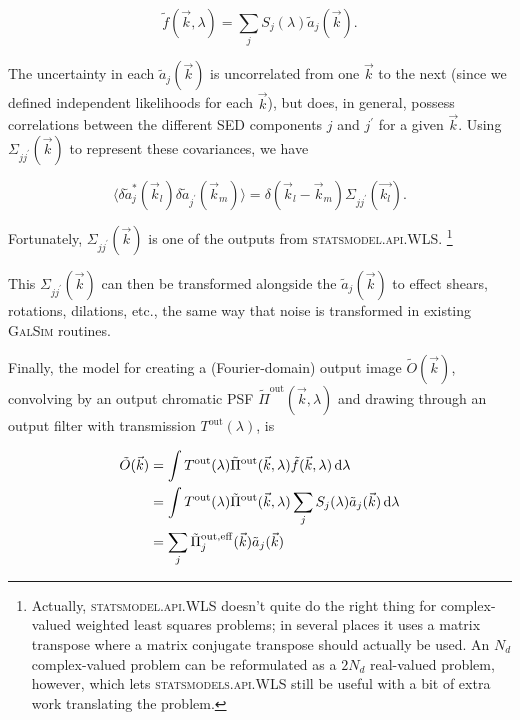 \documentclass{article}
\begin{document}
\begin{equation}
  \tilde{f}(\vec{k}, \lambda) = \sum_j S_j(\lambda) \tilde{a}_j(\vec{k}).
\end{equation}

The uncertainty in each $\tilde{a}_j(\vec{k})$ is uncorrelated from one $\vec{k}$ to the next (since
we defined independent likelihoods for each $\vec{k}$), but does, in general, possess correlations
between the different SED components $j$ and $j^\prime$ for a given $\vec{k}$.  Using
$\Sigma_{jj^\prime}(\vec{k})$ to represent these covariances, we have

\begin{equation}
    \langle\delta\tilde{a}^*_j(\vec{k}_l)\delta\tilde{a}_{j^\prime}(\vec{k}_m)\rangle = \delta(\vec{k}_l - \vec{k}_m)\Sigma_{jj^\prime}(\vec{k_l}).
\end{equation}

Fortunately, $\Sigma_{jj^\prime}(\vec{k})$ is one of the outputs from \textsc{statsmodel.api.WLS}.
\footnote{Actually, \textsc{statsmodel.api.WLS} doesn't quite do the right thing for complex-valued
weighted least squares problems; in several places it uses a matrix transpose where a matrix
conjugate transpose should actually be used.  An $N_d$ complex-valued problem can be reformulated as
a $2 N_d$ real-valued problem, however, which lets \textsc{statsmodels.api.WLS} still be useful with
a bit of extra work translating the problem.}

This $\Sigma_{jj^\prime}(\vec{k})$ can then be transformed alongside the $\tilde{a}_j(\vec{k})$ to
effect shears, rotations, dilations, etc., the same way that noise is transformed in existing
\textsc{GalSim} routines.

Finally, the model for creating a (Fourier-domain) output image $\tilde{O}(\vec{k})$, convolving by
an output chromatic PSF $\tilde{\Pi}^\mathrm{out}(\vec{k}, \lambda)$ and drawing through an output
filter with transmission $T^\mathrm{out}(\lambda)$, is

\begin{align}
    \tilde{O}(\vec{k})
    &= \int T^\mathrm{out}(\lambda) \tilde{\Pi}^\mathrm{out}(\vec{k}, \lambda) \tilde{f}(\vec{k}, \lambda) \dif{\lambda} \\
    &= \int T^\mathrm{out}(\lambda) \tilde{\Pi}^\mathrm{out}(\vec{k}, \lambda) \sum_j S_j(\lambda) \tilde{a}_j(\vec{k}) \dif{\lambda} \\
    &= \sum_j \tilde{\Pi}_j^\mathrm{out, eff}(\vec{k}) \tilde{a}_j(\vec{k})
\end{align}
\end{document}
